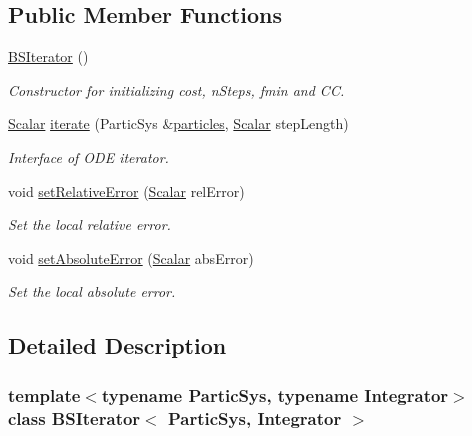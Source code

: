 \subsection*{Public Member Functions}
\begin{DoxyCompactItemize}
\item 
\mbox{\hyperlink{class_b_s_iterator_a144fb5c55fcd7bc873e73f4d06276fb2}{B\+S\+Iterator}} ()
\begin{DoxyCompactList}\small\item\em Constructor for initializing cost, n\+Steps, fmin and CC. \end{DoxyCompactList}\item 
\mbox{\hyperlink{class_b_s_iterator_a44773ad0f46d97005c8e21fa7c155c6f}{Scalar}} \mbox{\hyperlink{class_b_s_iterator_a47c558caa06982900eac316e10b50d4d}{iterate}} (Partic\+Sys \&\mbox{\hyperlink{classparticles}{particles}}, \mbox{\hyperlink{class_b_s_iterator_a44773ad0f46d97005c8e21fa7c155c6f}{Scalar}} step\+Length)
\begin{DoxyCompactList}\small\item\em Interface of O\+DE iterator. \end{DoxyCompactList}\item 
void \mbox{\hyperlink{class_b_s_iterator_ada9b6cc673e297135646699d581fcdc7}{set\+Relative\+Error}} (\mbox{\hyperlink{class_b_s_iterator_a44773ad0f46d97005c8e21fa7c155c6f}{Scalar}} rel\+Error)
\begin{DoxyCompactList}\small\item\em Set the local relative error. \end{DoxyCompactList}\item 
void \mbox{\hyperlink{class_b_s_iterator_a57603539823be271c2229d0951b7d957}{set\+Absolute\+Error}} (\mbox{\hyperlink{class_b_s_iterator_a44773ad0f46d97005c8e21fa7c155c6f}{Scalar}} abs\+Error)
\begin{DoxyCompactList}\small\item\em Set the local absolute error. \end{DoxyCompactList}\end{DoxyCompactItemize}


\subsection{Detailed Description}
\subsubsection*{template$<$typename Partic\+Sys, typename Integrator$>$\newline
class B\+S\+Iterator$<$ Partic\+Sys, Integrator $>$}

